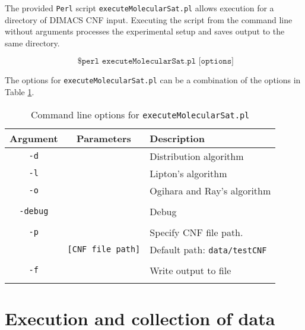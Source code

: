 The provided \texttt{Perl} script \texttt{executeMolecularSat.pl} allows execution for a directory of DIMACS CNF input.  Executing the script from the command line without arguments processes the experimental setup and saves output to the same directory.

\[
\texttt{ \$ perl executeMolecularSat.pl [options]}
\]

The options for \texttt{executeMolecularSat.pl} can be a combination of the options in Table \ref{executeMolecularSatTable}.

\begin{table}[htdp]
\caption{Command line options for \texttt{executeMolecularSat.pl}}
\begin{center}
\begin{tabular}{|c|c|l|}
\hline
\textbf{Argument} & \textbf{Parameters} & \textbf{Description} \\ \hline
 \texttt{-d}	& 				   & Distribution algorithm		 \\
 \texttt{-l}	& 				   & Lipton's algorithm		 \\
 \texttt{-o}	& 				   & Ogihara and Ray's algorithm		 \\
 				&				   &		 \\ \hline 				
\texttt{-debug}		&				   & Debug		 \\ 				
 				&				   &		 \\ \hline
\texttt{-p}		&				   & Specify CNF file path. 	 \\
 				& \texttt{[CNF file path]}  &		Default path: \texttt{data/testCNF}	 \\ 			
 				&				   &		\\ \hline 	
\texttt{-f}		&				   & Write output to file		 \\
 				&				   &		\\ \hline 				
\end{tabular}
\end{center}
\label{executeMolecularSatTable}
\end{table}%

\FloatBarrier


	\section{Execution and collection of data}

